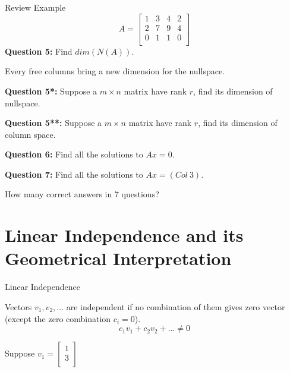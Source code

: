 \documentclass{beamer}
\begin{document}
\begin{frame}{Review Example}
\begin{equation*}
    A=\left[ \begin{matrix}
        1&		3&		4&		2\\
        2&		7&		9&		4\\
        0&		1&		1&		0\\
    \end{matrix} \right]
\end{equation*}
\textbf{Question 5:} Find $dim(N(A))$.

\vspace{3pt}
Every free columns bring a new dimension for the nullspace.

\vspace{5pt}
\textbf{Question 5*:} Suppose a $m \times n$ matrix have rank $r$, find its dimension of nullspace.

\vspace{5pt}
\textbf{Question 5**:} Suppose a $m \times n$ matrix have rank $r$, find its dimension of column space.

\vspace{5pt}
\textbf{Question 6:} Find all the solutions to $Ax=0$.

\vspace{5pt}
\textbf{Question 7:} Find all the solutions to $Ax=(Col\:3)$.

\vspace{3pt}
How many correct answers in 7 questions?
\end{frame}

\section{Linear Independence and its Geometrical Interpretation}
\begin{frame}{Linear Independence}
\begin{theorem}
Vectors $v_1, v_2, ...$ are independent if no combination of them gives zero vector (except the zero combination $c_i=0$).
\vspace{-8pt}
\begin{equation*}
    c_1v_1+c_2v_2+...\ne0
\end{equation*}
\end{theorem}

Suppose $v_1=\left[ \begin{array}{c}
	1\\
	3\\
\end{array} \right] $

\end{frame}
\end{document}

